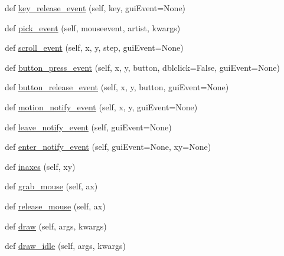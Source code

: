 \begin{DoxyCompactItemize}
\item 
def \hyperlink{classmatplotlib_1_1backend__bases_1_1FigureCanvasBase_aa4520faf76d6bac0f2094b87134cf1ab}{key\+\_\+release\+\_\+event} (self, key, gui\+Event=None)
\item 
def \hyperlink{classmatplotlib_1_1backend__bases_1_1FigureCanvasBase_af381fc942ba3bb408008991a34b86ea1}{pick\+\_\+event} (self, mouseevent, artist, kwargs)
\item 
def \hyperlink{classmatplotlib_1_1backend__bases_1_1FigureCanvasBase_a4eb6feddcdf02352d4ee188465bd30ab}{scroll\+\_\+event} (self, x, y, step, gui\+Event=None)
\item 
def \hyperlink{classmatplotlib_1_1backend__bases_1_1FigureCanvasBase_aa0da6d8db1a58abefb2c24bdbd93e43e}{button\+\_\+press\+\_\+event} (self, x, y, button, dblclick=False, gui\+Event=None)
\item 
def \hyperlink{classmatplotlib_1_1backend__bases_1_1FigureCanvasBase_a414a8fafb074945bf907b21552b3d8b0}{button\+\_\+release\+\_\+event} (self, x, y, button, gui\+Event=None)
\item 
def \hyperlink{classmatplotlib_1_1backend__bases_1_1FigureCanvasBase_a20dd9c5eaf95d0b8f3712ca83dbb8707}{motion\+\_\+notify\+\_\+event} (self, x, y, gui\+Event=None)
\item 
def \hyperlink{classmatplotlib_1_1backend__bases_1_1FigureCanvasBase_adeb2d10d64a18ca4855b3493032aaf2b}{leave\+\_\+notify\+\_\+event} (self, gui\+Event=None)
\item 
def \hyperlink{classmatplotlib_1_1backend__bases_1_1FigureCanvasBase_ab5e1531fcbba8202340737b6be399a08}{enter\+\_\+notify\+\_\+event} (self, gui\+Event=None, xy=None)
\item 
def \hyperlink{classmatplotlib_1_1backend__bases_1_1FigureCanvasBase_ab062f31d9e9965d21a2d13ca47d7d301}{inaxes} (self, xy)
\item 
def \hyperlink{classmatplotlib_1_1backend__bases_1_1FigureCanvasBase_ada6d9103c321aa84cce83daf7614c0b4}{grab\+\_\+mouse} (self, ax)
\item 
def \hyperlink{classmatplotlib_1_1backend__bases_1_1FigureCanvasBase_a023527795c83440f326f5a0ae4821829}{release\+\_\+mouse} (self, ax)
\item 
def \hyperlink{classmatplotlib_1_1backend__bases_1_1FigureCanvasBase_a22552de97fd78cabaa05adb20daa92e2}{draw} (self, args, kwargs)
\item 
def \hyperlink{classmatplotlib_1_1backend__bases_1_1FigureCanvasBase_a4b83ecf82e04e71ef9317c484c44ee04}{draw\+\_\+idle} (self, args, kwargs)

\end{DoxyCompactItemize}

